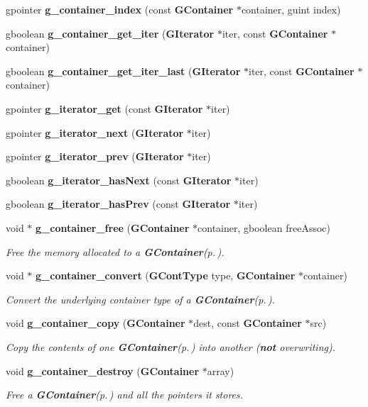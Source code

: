 \begin{CompactItemize}
\item 
gpointer {\bf g\_\-container\_\-index} (const {\bf GContainer} $\ast$container, guint index)
\item 
gboolean {\bf g\_\-container\_\-get\_\-iter} ({\bf GIterator} $\ast$iter, const {\bf GContainer} $\ast$container)
\item 
gboolean {\bf g\_\-container\_\-get\_\-iter\_\-last} ({\bf GIterator} $\ast$iter, const {\bf GContainer} $\ast$container)
\item 
gpointer {\bf g\_\-iterator\_\-get} (const {\bf GIterator} $\ast$iter)
\item 
gpointer {\bf g\_\-iterator\_\-next} ({\bf GIterator} $\ast$iter)
\item 
gpointer {\bf g\_\-iterator\_\-prev} ({\bf GIterator} $\ast$iter)
\item 
gboolean {\bf g\_\-iterator\_\-has\-Next} (const {\bf GIterator} $\ast$iter)
\item 
gboolean {\bf g\_\-iterator\_\-has\-Prev} (const {\bf GIterator} $\ast$iter)
\item 
void $\ast$ {\bf g\_\-container\_\-free} ({\bf GContainer} $\ast$container, gboolean free\-Assoc)
\begin{CompactList}\small\item\em Free the memory allocated to a {\bf GContainer}{\rm (p.\,\pageref{structGContainer})}. \item\end{CompactList}\item 
void $\ast$ {\bf g\_\-container\_\-convert} ({\bf GCont\-Type} type, {\bf GContainer} $\ast$container)
\begin{CompactList}\small\item\em Convert the underlying container type of a {\bf GContainer}{\rm (p.\,\pageref{structGContainer})}. \item\end{CompactList}\item 
void {\bf g\_\-container\_\-copy} ({\bf GContainer} $\ast$dest, const {\bf GContainer} $\ast$src)
\begin{CompactList}\small\item\em Copy the contents of one {\bf GContainer}{\rm (p.\,\pageref{structGContainer})} into another ({\bf not} overwriting). \item\end{CompactList}\item 
void {\bf g\_\-container\_\-destroy} ({\bf GContainer} $\ast$array)
\begin{CompactList}\small\item\em Free a {\bf GContainer}{\rm (p.\,\pageref{structGContainer})} and all the pointers it stores. \item\end{CompactList}\item 

\end{CompactItemize}
